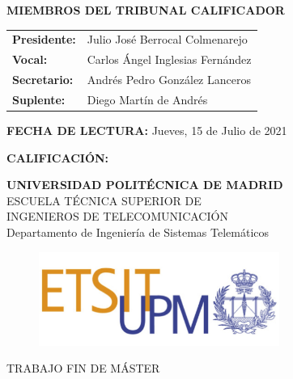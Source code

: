 {\large{\bf MIEMBROS DEL TRIBUNAL CALIFICADOR}} \vspace{0.5cm}

\begin{rm}
    \begin{tabular}{p{3cm}p{10cm}}
        \textbf{Presidente:} & Julio José Berrocal Colmenarejo\\
        \textbf{Vocal:} & Carlos Ángel Inglesias Fernández\\
        \textbf{Secretario:} & Andrés Pedro González Lanceros\\
        \textbf{Suplente:} & Diego Martín de Andrés
    \end{tabular}
\end{rm}
\vspace{1cm}

{\large{\bf FECHA DE LECTURA: } Jueves, 15 de Julio de 2021}
\vspace{1cm}

{\large{\bf CALIFICACIÓN:}}
\pagestyle{empty}
\cleardoublepage
\begin{center}
	
	{\LARGE\rm\textbf{UNIVERSIDAD POLITÉCNICA DE MADRID}\\
	    \vspace{1cm}
	    ESCUELA TÉCNICA SUPERIOR DE\\ INGENIEROS DE TELECOMUNICACIÓN
	}   \\

	{\Large\rm Departamento de Ingeniería de Sistemas Telemáticos\\
	}  

    \begin{figure}[!htbp]
	    \centering
        \includegraphics[width=0.7\textwidth]{img/logo_etsit.jpg}
    \end{figure}
    
	\vspace{1cm}
    {\Large\rm TRABAJO FIN DE MÁSTER\\
	    \vspace{1.5cm}
        \MakeUppercase{ \textbf{\tfmtitle} } \\ 
	} 
	\vspace{1cm}
    \Large\rm\textbf{\authorname}\\ 
    \fecha

\end{center}  

\cleardoublepage
